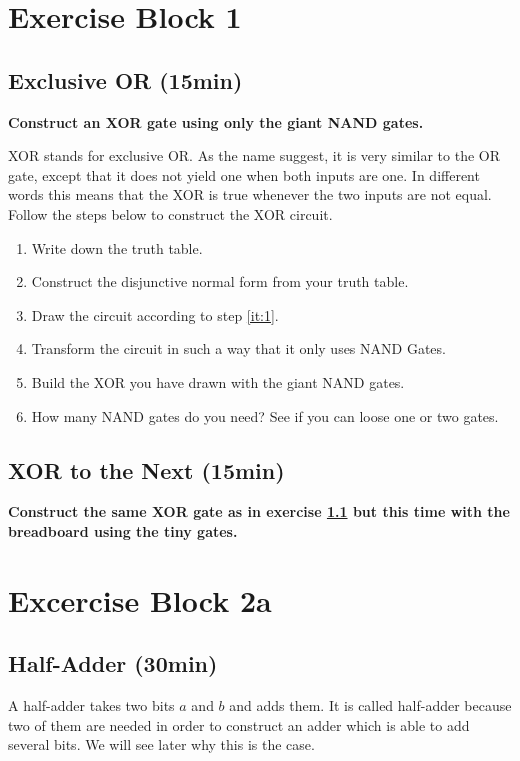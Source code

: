 \newpage
\section{Exercise Block 1}

\subsection{Exclusive OR (15min)}\label{subsec:ex-1}
\textbf{Construct an XOR gate using only the giant NAND gates.}

 XOR stands for exclusive OR. As the name suggest, it is very similar to the OR gate, except that it does not yield one when both inputs are one. In different words this means that the XOR is true whenever the two inputs are not equal. Follow the steps below to construct the XOR circuit.
\begin{enumerate}
	\item Write down the truth table.
	\item\label{it:1} Construct the disjunctive normal form from your truth table.
	\item Draw the circuit according to step \ref{it:1}.
	\item Transform the circuit in such a way that it only uses NAND Gates.
	\item Build the XOR you have drawn with the giant NAND gates.
	\item How many NAND gates do you need? See if you can loose one or two gates.
\end{enumerate}

\subsection{XOR to the Next (15min)}
\textbf{Construct the same XOR gate as in exercise \ref{subsec:ex-1} but this time with the breadboard using the tiny gates.}


\section{Excercise Block 2a}

\subsection{Half-Adder (30min)}

A half-adder takes two bits $a$ and $b$ and adds them. It is called half-adder because two of them are needed in order to construct an adder which is able to add several bits. We will see later why this is the case.

